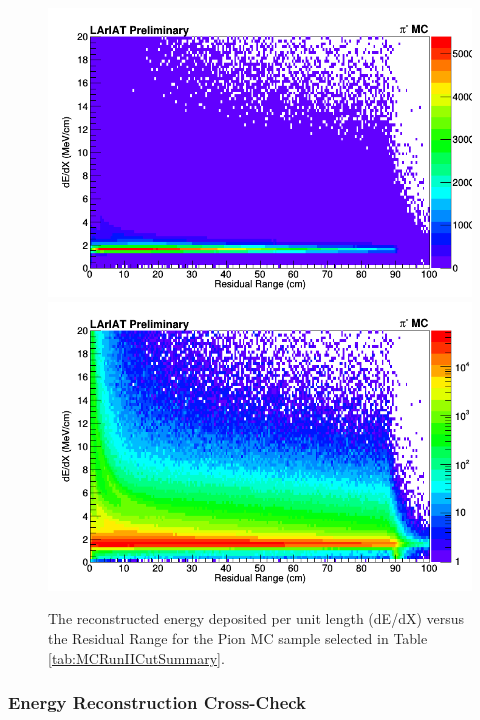 \begin{figure}[h!]
\centering
\includegraphics[scale=0.33]{./images/dEdXvsRRPionMC.png}
\includegraphics[scale=0.33]{./images/dEdXvsRRPionMCLog.png}
\caption{The reconstructed energy deposited per unit length (dE/dX) versus the Residual  Range for the Pion MC sample selected in Table \ref{tab:MCRunIICutSummary}.}
\label{fig:PionMCdEdXvsRR}
\end{figure}

\newpage
\subsubsection{Energy Reconstruction Cross-Check} \label{sec:ERecoCrossCheck}

